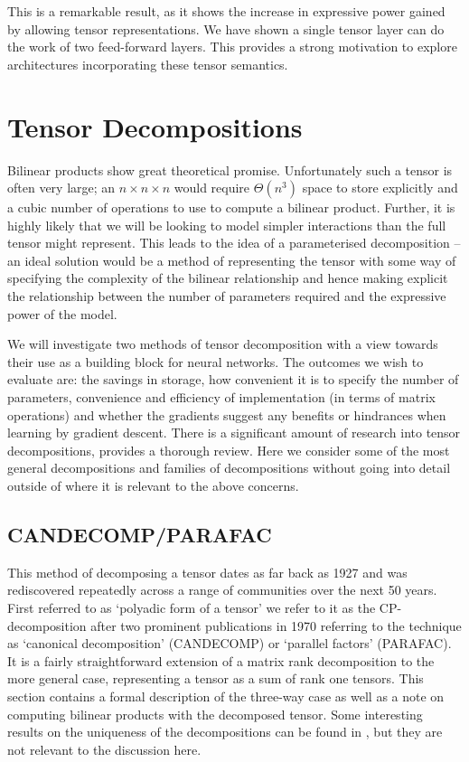 This is a remarkable result, as it shows the increase in expressive power gained by allowing
tensor representations. We have shown a single tensor layer can do the work of two feed-forward
layers. This provides a strong motivation to explore architectures incorporating these tensor
semantics.


\section{Tensor Decompositions}
Bilinear products show great theoretical promise. Unfortunately
such a tensor is often very large; an \(n \times n \times n\) would require \(\Theta(n^3)\) space
to store explicitly and a cubic number of operations to use to compute a bilinear product. Further,
it is highly likely that we will be looking to model simpler interactions than the full tensor
might represent. This leads to the idea of a parameterised decomposition -- an ideal solution
would be a method of representing the tensor with some way of specifying the complexity of the
bilinear relationship and hence making explicit the relationship between the number of parameters
required and the expressive power of the model. 

We will investigate two methods of tensor decomposition with a view towards their use as a building
block for neural networks. The outcomes we wish to evaluate are: the savings in storage, how
convenient it is to specify the number of parameters, convenience and efficiency of implementation
(in terms of matrix operations) and whether the gradients suggest any benefits or hindrances when
learning by gradient descent. There is a significant amount of research into tensor decompositions,
\autocite{Kolda2009} provides a thorough review. Here we consider some of the most general
decompositions and families of decompositions without going into detail outside of where it is
relevant to the above concerns.

\subsection{CANDECOMP/PARAFAC}
This method of decomposing a tensor dates as far back as 1927 
\autocite{Hitchcock1927, Hitchcock1928} and was rediscovered repeatedly across a range of
communities over the next 50 years. \autocite{Kolda2009} First referred to as `polyadic
form of a tensor' we refer to it as the CP-decomposition after two prominent publications in
1970 referring to the technique as `canonical decomposition' (CANDECOMP) \autocite{Carroll1970}
 or `parallel factors' (PARAFAC). \autocite{Harshman1970}
 It is a fairly straightforward
extension of a matrix rank decomposition to the more general case, representing a tensor as
a sum of rank one tensors. This section contains a formal description of the three-way case
as well as a note on computing bilinear products with the decomposed tensor.
Some interesting results on the uniqueness of the decompositions can be found in \autocite{Kolda2009},
but they are not relevant to the discussion here.


